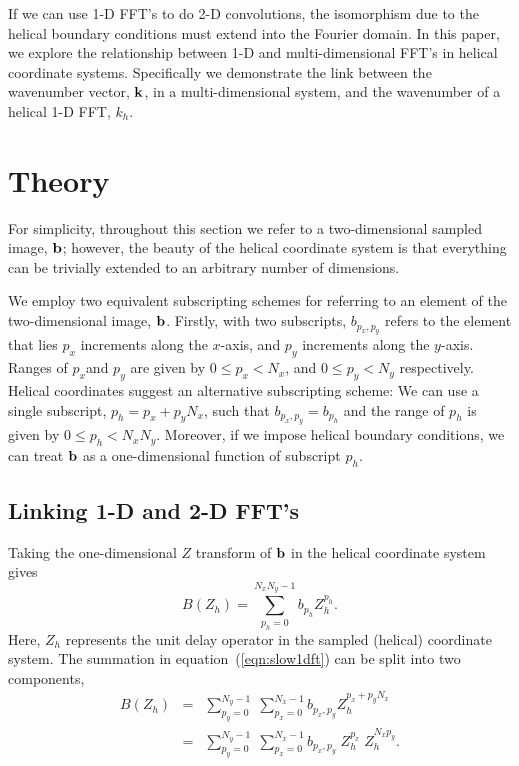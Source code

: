 \par
If we can use 1-D FFT's to do 2-D convolutions, the isomorphism due to
the helical boundary conditions must extend into the Fourier domain.  
In this paper, we explore the relationship between 1-D and
multi-dimensional FFT's in helical coordinate systems.  Specifically
we demonstrate the link between the wavenumber vector, ${\bf k}$, in a 
multi-dimensional system, and the wavenumber of a helical 1-D FFT,
$k_h$. 


\section{Theory}
For simplicity, throughout this section we refer to a two-dimensional 
sampled image, ${\bf b}$; however, the beauty of the helical
coordinate system is that everything can be trivially extended to an
arbitrary number of dimensions.  

\par
We employ two equivalent subscripting schemes for
referring to an element of the two-dimensional image, ${\bf b}$.  
Firstly, with two subscripts, $b_{p_x,p_y}$ refers to the element 
that lies $p_x$ increments along the $x$-axis, and $p_y$
increments along the $y$-axis. 
Ranges of $p_x$and $p_y$ are given by 
$0 \leq p_x < N_x$, and 
$0 \leq p_y < N_y$ respectively. 
Helical coordinates suggest an alternative subscripting scheme:
We can use a single subscript, $p_h=p_x + p_y N_x$, 
such that $b_{p_x,p_y} = b_{p_h}$ and the range of $p_h$ is given by 
$0 \leq p_h < N_x N_y$.
Moreover, if we impose helical boundary conditions, we can
treat ${\bf b}$ as a one-dimensional function of subscript $p_h$.

\subsection{Linking 1-D and 2-D FFT's}
Taking the one-dimensional $Z$ transform of ${\bf b}$ in the helical
coordinate system gives
\begin{equation} \label{eqn:slow1dft}
B(Z_h) = \sum_{p_h=0}^{N_x N_y -1} b_{p_h} Z_h^{p_h}.
\end{equation}
Here, $Z_h$ represents the unit delay operator in the sampled
(helical) coordinate system. 
The summation in equation~(\ref{eqn:slow1dft}) can be split into two
components, 
\begin{eqnarray}
B(Z_h) 
& = & \sum_{p_y=0}^{N_y-1} \; \sum_{p_x=0}^{N_x-1} b_{p_x,p_y} 
Z_h^{p_x+ p_y N_x} \\
& = & \sum_{p_y=0}^{N_y-1} \; \sum_{p_x=0}^{N_x-1} b_{p_x,p_y} 
\; Z_h^{p_x} \; Z_h^{N_x p_y}. \label{eqn:halfway}
\end{eqnarray}

